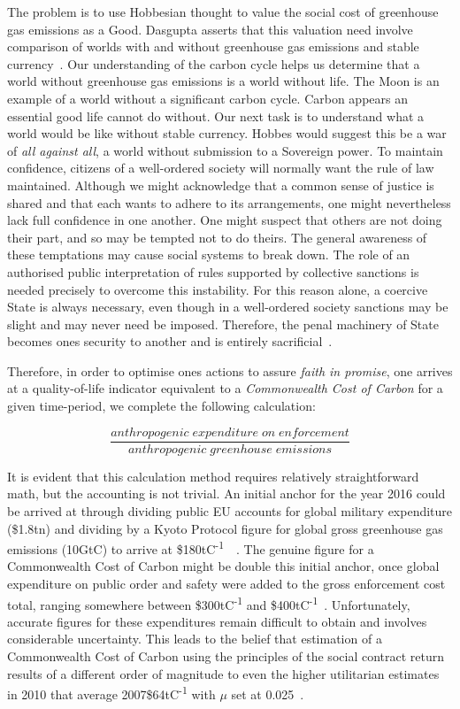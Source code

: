 \documentclass[11pt, oneside]{book}   	%
\begin{document}
The problem is to use Hobbesian thought to value the social cost of greenhouse gas emissions as a Good.
Dasgupta asserts that this valuation need involve comparison of worlds with and without greenhouse gas emissions and stable currency~\cite{pd2}.
Our understanding of the carbon cycle helps us determine that a world without greenhouse gas emissions is a world without life.
The Moon is an example of a world without a significant carbon cycle.
Carbon appears an essential good life cannot do without.
Our next task is to understand what a world would be like without stable currency.
Hobbes would suggest this be a war of \emph{all against all}, a world without submission to a Sovereign power.
To maintain confidence, citizens of a well-ordered society will normally want the rule of law maintained.
Although we might acknowledge that a common sense of justice is shared and that each wants to adhere to its arrangements, one might nevertheless lack full confidence in one another.
One might suspect that others are not doing their part, and so may be tempted not to do theirs.
The general awareness of these temptations may cause social systems to break down.
The role of an authorised public interpretation of rules supported by collective sanctions is needed precisely to overcome this instability.
For this reason alone, a coercive State is always necessary, even though in a well-ordered society sanctions may be slight and may never need be imposed.
Therefore, the penal machinery of State becomes ones security to another and is entirely sacrificial~\cite{jr1}.\par

Therefore, in order to optimise ones actions to assure \emph{faith in promise}, one arrives at a quality-of-life indicator equivalent to a \emph{Commonwealth Cost of Carbon} for a given time-period, we complete the following calculation:

\begin{equation}
	\frac{anthropogenic\; expenditure\; on\; enforcement}{anthropogenic\; greenhouse\; emissions}
\end{equation}

It is evident that this calculation method requires relatively straightforward math, but the accounting is not trivial.
An initial anchor for the year 2016 could be arrived at through dividing public EU accounts for global military expenditure (\$1.8tn) and dividing by a Kyoto Protocol figure for global gross greenhouse gas emissions (10GtC) to arrive at \$180tC\textsuperscript{-1}~\cite{eu1}~\cite{co1}.
The genuine figure for a Commonwealth Cost of Carbon might be double this initial anchor, once global expenditure on public order and safety were added to the gross enforcement cost total, ranging somewhere between \$300tC\textsuperscript{-1} and \$400tC\textsuperscript{-1}~\cite{oecd1}.
Unfortunately, accurate figures for these expenditures remain difficult to obtain and involves considerable uncertainty.
This leads to the belief that estimation of a Commonwealth Cost of Carbon using the principles of the social contract return results of a different order of magnitude to even the higher utilitarian estimates in 2010 that average 2007\$64tC\textsuperscript{-1}  with $\mu$ set at 0.025~\cite{iwg1}.
\end{document}
